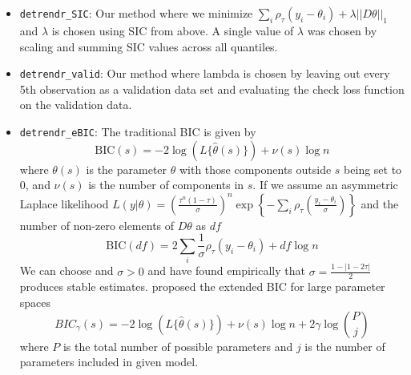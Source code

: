 \documentclass[]{article}
\begin{document}
\begin{itemize}
	\item \texttt{detrendr\_SIC}: Our method where we minimize
	$\sum_i\rho_{\tau}(y_i - \theta_i) + \lambda||D\theta||_1$ and $\lambda$ is chosen using SIC from above. A single value of $\lambda$ was chosen by scaling and summing SIC values across all quantiles. 
	\item \texttt{detrendr\_valid}: Our method where lambda is chosen by leaving out every 5th observation as a validation data set and evaluating the check loss function on the validation data.
	\item \texttt{detrendr\_eBIC}:   The traditional BIC is given by 
	\begin{equation}
	\mbox{BIC}(s) = -2\log(L\{\hat{\theta}(s)\}) + \nu(s)\log n 
	\end{equation}	
	where $\theta(s)$ is the parameter $\theta$ with those components outside $s$ being set to 0, and $\nu(s)$ is the number of components in $s$. If we assume an asymmetric Laplace likelihood $L(y|\theta) = \left(\frac{\tau^n(1-\tau)}{\sigma}\right)^n\exp\left\{-\sum_i\rho_\tau(\frac{y_i - \theta_i}{\sigma})\right\}$ and the number of non-zero elements of $D\theta$ as $df$
	\begin{equation}
	\mbox{BIC}(df) = 2\sum_i\frac{1}{\sigma}\rho_{\tau}(y_i-\theta_i) + df\log n
	\end{equation} 
	We can choose and $\sigma>0$ and have found empirically that $\sigma =  \frac{1-|1-2\tau|}{2}$ produces stable estimates. \cite{chen2008} proposed the extended BIC for large parameter spaces 
	\begin{equation}
	BIC_{\gamma}(s) = -2\log(L\{\hat{\theta}(s)\}) + \nu(s)\log n  + 2\gamma\log{P\choose j}
	\end{equation}
	where $P$ is the total number of possible parameters and $j$ is the number of parameters included in given model. 
	
\end{itemize}
\end{document}
